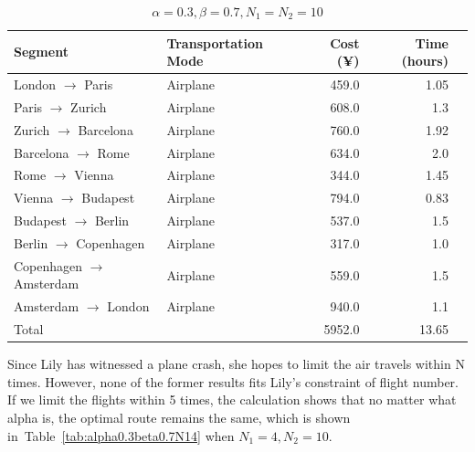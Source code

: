 \documentclass{article}
\begin{document}
\begin{table}[!ht]
  \centering
  \begin{tabular}{llrrr}
    \toprule
    Segment                          & Transportation Mode & Cost (¥) & Time (hours) \\
    \midrule
    London $\rightarrow$  Paris      & Airplane            & 459.0    & 1.05         \\
    Paris $\rightarrow$  Zurich      & Airplane            & 608.0    & 1.3          \\
    Zurich $\rightarrow$  Barcelona  & Airplane            & 760.0    & 1.92         \\
    Barcelona $\rightarrow$  Rome    & Airplane            & 634.0    & 2.0          \\
    Rome $\rightarrow$  Vienna       & Airplane            & 344.0    & 1.45         \\
    Vienna $\rightarrow$  Budapest   & Airplane            & 794.0    & 0.83         \\
    Budapest $\rightarrow$  Berlin   & Airplane            & 537.0    & 1.5          \\
    Berlin $\rightarrow$  Copenhagen & Airplane            & 317.0    & 1.0          \\
    Copenhagen $\rightarrow$  Amsterdam & Airplane          & 559.0    & 1.5          \\
    Amsterdam $\rightarrow$  London  & Airplane            & 940.0    & 1.1          \\
    \midrule
    Total                            &                     & 5952.0   & 13.65        \\
    \bottomrule
  \end{tabular}
  \caption{$\alpha=0.3, \beta=0.7, N_1=N_2=10$}%
  \label{tab:alpha0.3beta0.7}
\end{table}

Since Lily has witnessed a plane crash, she hopes to limit the air travels within N times. However, none of the former results fits Lily's constraint of flight number. If we limit the flights within 5 times, the calculation shows that no matter what alpha is, the optimal route remains the same, which is shown in~Table~\ref{tab:alpha0.3beta0.7N14} when $N_1=4, N_2=10$. 
\end{document}

